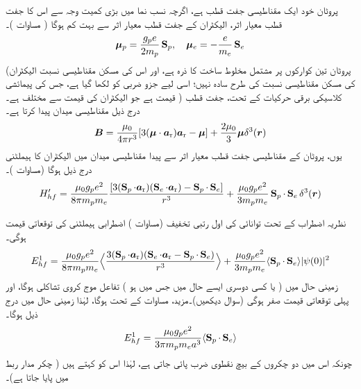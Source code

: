 پروٹان خود ایک مقناطیسی جفت قطب ہے، اگرچہ نسب نما میں بڑی کمیت وجہ سے اس کا جفت قطب معیار اثر، الیکٹران کے جفت قطب معیار اثر سے بہت کم ہوگا ( مساوات )۔ 
\begin{align}
{\ensuremath{{\boldsymbol{\mu}}}}_p = \frac{g_p e}{2 m_p} \operatorname{\mathbf{S}}_p, \quad {\ensuremath{{\boldsymbol{\mu}}}}_e = - \frac{e}{m_e} \operatorname{\mathbf{S}}_e
\end{align}
(پروٹان تین کوارکوں پر مشتمل مخلوط ساخت کا ذرہ ہے، اور اس کی مسکن مقناطیسی نسبت الیکٹران کی مسکن مقناطیسی نسبت کی طرح سادہ نہیں؛ اسی لیے  جزو ضربی کو  لکھا گیا ہے، جس کی پیمائشی قیمت  ہے جو الیکٹران کی قیمت  سے مختلف ہے۔ ) کلاسیکی برقی حرکیات کے تحت، جفت قطب  درج ذیل مقناطیسی میدان پیدا کرتا ہے۔
\begin{align}\label{مساوات_غیر_مضطرب_پروٹان_میدان}
{\ensuremath{{\boldsymbol{B}}}} = \frac{\mu_0}{4 \pi r^3} [3 ({{\boldsymbol{\mu}}} \cdot {\ensuremath{{\boldsymbol{a}}}_{\textup{r}}}) {{\boldsymbol{a}}_{\textup{r}}} - {{\boldsymbol{\mu}}}] + \frac{2 \mu_0}{3} {{\boldsymbol{\mu}}} \delta^3 ({{\boldsymbol{r}}})
\end{align}
یوں، پروٹان کے مقناطیسی جفت قطب معیار اثر سے پیدا مقناطیسی میدان میں الیکٹران کا ہیملٹنی درج ذیل ہوگا (مساوات )۔ 
\begin{align}
H'_{hf} = \frac{\mu_0 g_p e^2}{8 \pi m_p m_e} \frac{[3(\operatorname{\mathbf{S}}_p \cdot {\ensuremath{{\boldsymbol{a}}}_{\textup{r}}})(\operatorname{\mathbf{S}}_e \cdot {\ensuremath{{\boldsymbol{a}}}_{\textup{r}}}) - \operatorname{\mathbf{S}}_p \cdot \operatorname{\mathbf{S}}_e]}{r^3} + \frac{\mu_0 g_p e^2}{3m_p m_e} \operatorname{\mathbf{S}}_p \cdot \operatorname{\mathbf{S}}_e \delta^3 ({{\boldsymbol{r}}})
\end{align}

نظریہ اضطراب کے تحت توانائی کی اول رتبی تخفیف (مساوات ) اضطرابی ہیملٹنی کی توقعاتی قیمت ہوگی۔
\begin{align}
E_{hf}^1 = \frac{\mu_0 g_p e^2}{8 \pi m_p m_e} \Big\langle \frac{3(\operatorname{\mathbf{S}}_p \cdot {\ensuremath{{\boldsymbol{a}}}_{\textup{r}}})(\operatorname{\mathbf{S}}_e \cdot {\ensuremath{{\boldsymbol{a}}}_{\textup{r}}} - \operatorname{\mathbf{S}}_p \cdot \operatorname{\mathbf{S}}_e)}{r^3} \Big\rangle + \frac{\mu _0 g_p e^2}{3 m_p m_e} \langle \operatorname{\mathbf{S}}_p \cdot \operatorname{\mathbf{S}}_e \rangle |\psi (0)|^2
\end{align}
زمینی حال میں ( یا کسی دوسری ایسے حال میں جس میں  ہو ) تفاعل موج کروی تشاکلی ہوگا، اور پہلی توقعاتی قیمت صفر ہوگی (سوال  دیکھیں)۔مزید، مساوات  کے تحت  ہوگا، لہٰذا زمینی حال میں درج ذیل ہوگا۔ 
\begin{align}
E_{hf}^1 = \frac{\mu_0 g_p e^2}{3 \pi m_p m_e a^3} \langle \operatorname{\mathbf{S}}_p \cdot \operatorname{\mathbf{S}}_e \rangle
\end{align}
چونکہ اس میں دو چکروں کے بیچ نقطوی ضرب پائی جاتی ہے، لہٰذا اس کو  کہتے ہیں ( چکر مدار ربط میں  پایا جاتا ہے)۔

